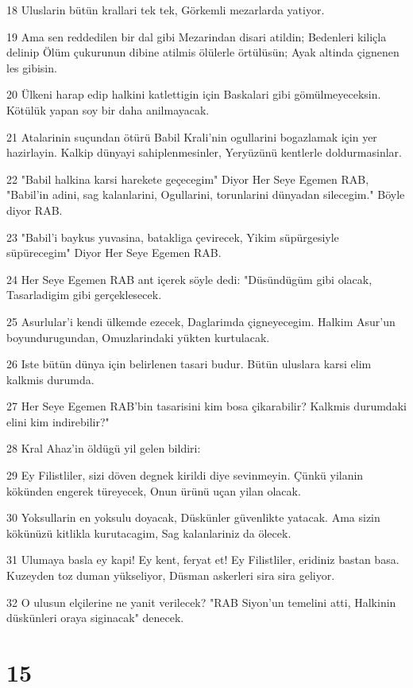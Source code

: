 \par 18 Uluslarin bütün krallari tek tek, Görkemli mezarlarda yatiyor.
\par 19 Ama sen reddedilen bir dal gibi Mezarindan disari atildin; Bedenleri kiliçla delinip Ölüm çukurunun dibine atilmis ölülerle örtülüsün; Ayak altinda çignenen les gibisin.
\par 20 Ülkeni harap edip halkini katlettigin için Baskalari gibi gömülmeyeceksin. Kötülük yapan soy bir daha anilmayacak.
\par 21 Atalarinin suçundan ötürü Babil Krali'nin ogullarini bogazlamak için yer hazirlayin. Kalkip dünyayi sahiplenmesinler, Yeryüzünü kentlerle doldurmasinlar.
\par 22 "Babil halkina karsi harekete geçecegim" Diyor Her Seye Egemen RAB, "Babil'in adini, sag kalanlarini, Ogullarini, torunlarini dünyadan silecegim." Böyle diyor RAB.
\par 23 "Babil'i baykus yuvasina, batakliga çevirecek, Yikim süpürgesiyle süpürecegim" Diyor Her Seye Egemen RAB.
\par 24 Her Seye Egemen RAB ant içerek söyle dedi: "Düsündügüm gibi olacak, Tasarladigim gibi gerçeklesecek.
\par 25 Asurlular'i kendi ülkemde ezecek, Daglarimda çigneyecegim. Halkim Asur'un boyundurugundan, Omuzlarindaki yükten kurtulacak.
\par 26 Iste bütün dünya için belirlenen tasari budur. Bütün uluslara karsi elim kalkmis durumda.
\par 27 Her Seye Egemen RAB'bin tasarisini kim bosa çikarabilir? Kalkmis durumdaki elini kim indirebilir?"
\par 28 Kral Ahaz'in öldügü yil gelen bildiri:
\par 29 Ey Filistliler, sizi döven degnek kirildi diye sevinmeyin. Çünkü yilanin kökünden engerek türeyecek, Onun ürünü uçan yilan olacak.
\par 30 Yoksullarin en yoksulu doyacak, Düskünler güvenlikte yatacak. Ama sizin kökünüzü kitlikla kurutacagim, Sag kalanlariniz da ölecek.
\par 31 Ulumaya basla ey kapi! Ey kent, feryat et! Ey Filistliler, eridiniz bastan basa. Kuzeyden toz duman yükseliyor, Düsman askerleri sira sira geliyor.
\par 32 O ulusun elçilerine ne yanit verilecek? "RAB Siyon'un temelini atti, Halkinin düskünleri oraya siginacak" denecek.

\chapter{15}

